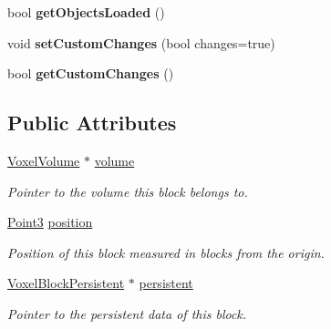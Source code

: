 \begin{DoxyCompactItemize}
\item 
\hypertarget{classVoxelBlock_aaf7cae8364481d85bdf7e511fd723261}{
bool {\bfseries get\-Objects\-Loaded} ()}
\label{d1/d83/classVoxelBlock_aaf7cae8364481d85bdf7e511fd723261}

\item 
\hypertarget{classVoxelBlock_a54e93f14d946d3914c505a2ae4269bb1}{
void {\bfseries set\-Custom\-Changes} (bool changes=true)}
\label{d1/d83/classVoxelBlock_a54e93f14d946d3914c505a2ae4269bb1}

\item 
\hypertarget{classVoxelBlock_a07d4783d3a4e93dd140be28b93a27e6c}{
bool {\bfseries get\-Custom\-Changes} ()}
\label{d1/d83/classVoxelBlock_a07d4783d3a4e93dd140be28b93a27e6c}

\end{DoxyCompactItemize}
\subsection*{\-Public \-Attributes}
\begin{DoxyCompactItemize}
\item 
\hypertarget{classVoxelBlock_aa8398251c9d5d3ba466e8993bcb6eb38}{
\hyperlink{classVoxelVolume}{\-Voxel\-Volume} $\ast$ \hyperlink{classVoxelBlock_aa8398251c9d5d3ba466e8993bcb6eb38}{volume}}
\label{d1/d83/classVoxelBlock_aa8398251c9d5d3ba466e8993bcb6eb38}

\begin{DoxyCompactList}\small\item\em \-Pointer to the volume this block belongs to. \end{DoxyCompactList}\item 
\hypertarget{classVoxelBlock_a29e1b285d9d48be6df311de56c5cd793}{
\hyperlink{classPoint3}{\-Point3} \hyperlink{classVoxelBlock_a29e1b285d9d48be6df311de56c5cd793}{position}}
\label{d1/d83/classVoxelBlock_a29e1b285d9d48be6df311de56c5cd793}

\begin{DoxyCompactList}\small\item\em \-Position of this block measured in blocks from the origin. \end{DoxyCompactList}\item 
\hypertarget{classVoxelBlock_ad9d2e2c26398379b6a92e2e5ea4ab20d}{
\hyperlink{classVoxelBlockPersistent}{\-Voxel\-Block\-Persistent} $\ast$ \hyperlink{classVoxelBlock_ad9d2e2c26398379b6a92e2e5ea4ab20d}{persistent}}
\label{d1/d83/classVoxelBlock_ad9d2e2c26398379b6a92e2e5ea4ab20d}

\begin{DoxyCompactList}\small\item\em \-Pointer to the persistent data of this block. \end{DoxyCompactList}\end{DoxyCompactItemize}
